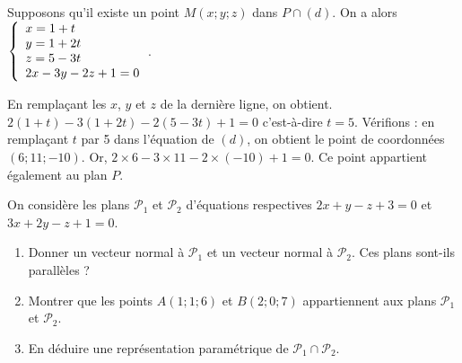 \documentclass[11pt,fleqn, openany]{book} %
\begin{document}
\begin{solution}Supposons qu'il existe un point $M(x;y;z)$ dans $P \cap (d)$. On a alors $\left\{ \renewcommand{\arraystretch}{1}\renewcommand{\arraystretch}{1}\begin{array}{l}x=1+t \\ y=1+2t \\ z = 5-3t \\ 2x-3y-2z+1=0 \end{array}\right.$.

En remplaçant les $x$, $y$ et $z$ de la dernière ligne, on obtient. $2(1+t)-3(1+2t)-2(5-3t)+1=0$ c'est-à-dire $t=5$. Vérifions : en remplaçant $t$ par 5 dans l'équation de $(d)$, on obtient le point de coordonnées $(6;11;-10)$. Or, $2\times 6 -3 \times 11 -2 \times (-10)+1=0$. Ce point appartient également au plan $P$.\end{solution}




\begin{exercise}On considère les plans $\mathcal{P}_1$ et $\mathcal{P}_2$ d'équations respectives $2x+y-z+3=0$ et $3x+2y-z+1=0$.

\begin{enumerate}
\item Donner un vecteur normal à $\mathcal{P}_1$ et un vecteur normal à $\mathcal{P}_2$. Ces plans sont-ils parallèles ?
\item Montrer que les points $A(1;1;6)$ et $B(2;0;7)$ appartiennent aux plans $\mathcal{P}_1$ et $\mathcal{P}_2$.
\item En déduire une représentation paramétrique de $\mathcal{P}_1 \cap \mathcal{P}_2$.
\end{enumerate}\end{exercise}
\end{document}
